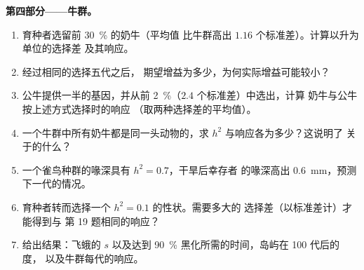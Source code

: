 \begin{problem}
\medskip
\noindent\textbf{第四部分——牛群。}
\begin{enumerate}[resume]
  \item 育种者选留前 \qty{30}{\%} 的奶牛（平均值
        比牛群高出 $1.16$ 个标准差）。计算以升为单位的选择差
        及其响应。
  \item 经过相同的选择五代之后，
        期望增益为多少，为何实际增益可能较小？
  \item 公牛提供一半的基因，并从前
        \qty{2}{\%}（$2.4$ 个标准差）中选出，计算
        奶牛与公牛按上述方式选择时的响应
        （取两种选择差的平均值）。
  \item 一个牛群中所有奶牛都是同一头动物的，求
        $h^{2}$ 与响应各为多少？这说明了
        关于的什么？
  \item 一个雀鸟种群的喙深具有 $h^{2} = 0.7$，干旱后幸存者
        的喙深高出 \qty{0.6}{mm}，预测
        下一代的情况。
  \item 育种者转而选择一个 $h^{2} = 0.1$ 的性状。需要多大的
        选择差（以标准差计）才能得到与
        第 19 题相同的响应？
  \item 给出结果：飞蛾的 $s$ 以及达到 \qty{90}{\%}
        黑化所需的时间，岛屿在 100 代后的度，
        以及牛群每代的响应。
\end{enumerate}
\end{problem}
